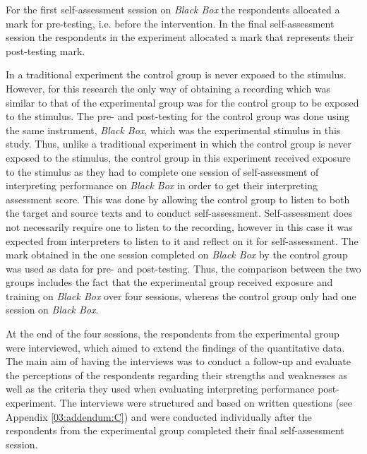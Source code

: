 \documentclass[output=paper]{langsci/langscibook}
\begin{document}
For the first self-assessment session on \textit{Black Box} the respondents allocated a mark for pre-testing, i.e. before the intervention. In the final self-assessment session the respondents in the experiment allocated a mark that represents their post-testing mark. 

In a traditional experiment the control group is never exposed to the stimulus. However, for this research the only way of obtaining a recording which was similar to that of the experimental group was for the control group to be exposed to the stimulus. The pre- and post-testing for the control group was done using the same instrument, \textit{Black Box}, which was the experimental stimulus in this study. Thus, unlike a traditional experiment in which the control group is never exposed to the stimulus, the control group in this experiment received exposure to the stimulus as they had to complete one session of self-assessment of interpreting performance on \textit{Black Box} in order to get their interpreting assessment score. This was done by allowing the control group to listen to both the target and source texts and to conduct self-assessment. Self-assessment does not necessarily require one to listen to the recording, however in this case it was expected from interpreters to listen to it and reflect on it for self-assessment. The mark obtained in the one session completed on \textit{Black Box} by the control group was used as data for pre- and post-testing. Thus, the comparison between the two groups includes the fact that the experimental group received exposure and training on \textit{Black Box} over four sessions, whereas the control group only had one session on \textit{Black Box}.

At the end of the four sessions, the respondents from the experimental group were interviewed, which aimed to extend the findings of the quantitative data. The main aim of having the interviews was to conduct a follow-up and evaluate the perceptions of the respondents regarding their strengths and weaknesses as well as the criteria they used when evaluating interpreting performance post-experiment. The interviews were structured and based on written questions (see Appendix \ref{03:addendum:C}) and were conducted individually after the respondents from the experimental group completed their final self-assessment session.
\end{document}
